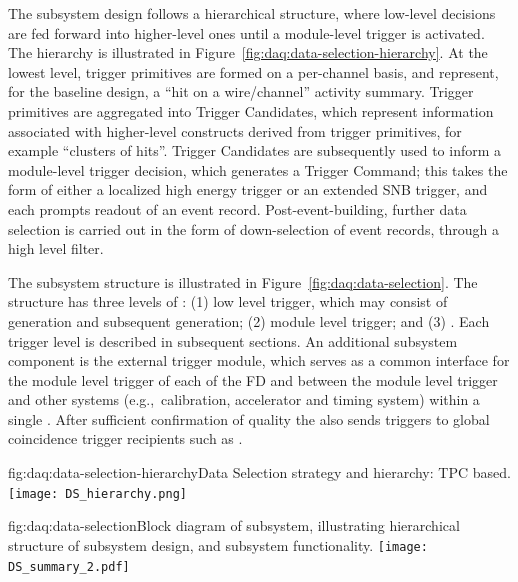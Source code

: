The  subsystem design follows a hierarchical structure, where low-level
decisions are fed forward into higher-level ones until a  module-level trigger is activated. The hierarchy
is illustrated in Figure~\ref{fig:daq:data-selection-hierarchy}. 
At the lowest level, trigger
primitives are formed on a per-channel basis, and represent, for the
baseline design, a ``hit on
a wire/channel'' activity summary. Trigger primitives are aggregated
into Trigger Candidates, which represent information associated with
higher-level constructs derived from trigger primitives,
for example
``clusters of hits''. Trigger
Candidates are subsequently used to inform a module-level trigger decision, which
generates a Trigger Command; this takes the form of either a localized high energy
trigger or an extended SNB trigger, and each prompts readout of an
event record. Post-event-building, further data selection is carried
out in the form of down-selection of event records, through a high
level filter. 

The subsystem structure is illustrated in
Figure~\ref{fig:daq:data-selection}. The structure
has three levels of : (1) low level trigger, which may consist of
 generation and subsequent
 generation; (2) module level trigger; and (3)
. Each trigger level is described in subsequent
sections. An additional subsystem component is the external trigger module,
which serves as a common interface for the
module level trigger of each of the FD  and between
the module level trigger and other systems (e.g.,~calibration,
accelerator and timing system) within a single
. After sufficient confirmation of quality the
 also sends  triggers
to global coincidence trigger recipients such as  .


\begin{dunefigure}{fig:daq:data-selection-hierarchy}{Data Selection
    strategy and hierarchy: TPC based.}
  \texttt{[image: DS\_hierarchy.png]}
\end{dunefigure}

\begin{dunefigure}{fig:daq:data-selection}{Block diagram of  
     subsystem, illustrating hierarchical structure of
    subsystem design, and subsystem functionality.}
  \texttt{[image: DS\_summary\_2.pdf]}
\end{dunefigure}



